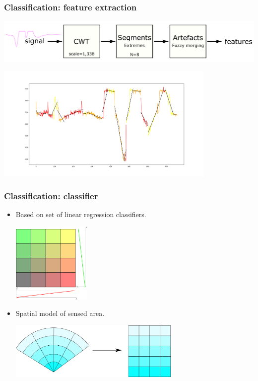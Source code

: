 \documentclass[10pt,xcolor=pdflatex]{beamer}
\begin{document}
\begin{frame}\frametitle{Classification: feature extraction}
    \begin{center}
        \includegraphics[width=1\textwidth]{img/features2.png}

        \includegraphics[width=0.8\textwidth]{img/artefacts.png}
    \end{center}
\end{frame}

\begin{frame}\frametitle{Classification: classifier}
    \begin{itemize}
        \item Based on set of linear regression classifiers.
            \begin{center}
                \includegraphics[width=0.3\textwidth]{img/area.png}
            \end{center}
            
        \item Spatial model of sensed area.
            \begin{center}
                \includegraphics[width=0.65\textwidth]{img/circularsector.png}
            \end{center}

    \end{itemize}
\end{frame}
\end{document}
